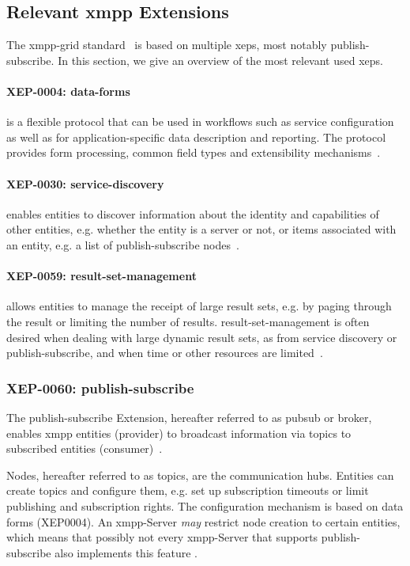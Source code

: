 \subsection{Relevant \gls{xmpp} Extensions}

The \gls{xmpp-grid} standard~\cite{ietf-mile-xmpp-grid-05} is based on multiple \glspl{xep}, most notably \gls{publish-subscribe}. In this section, we give an overview of the most relevant used \glspl{xep}.

\paragraph{XEP-0004: \gls{data-forms}} is a flexible protocol that can be used in workflows such as service configuration as well as for application-specific data description and reporting. The protocol provides form processing, common field types and extensibility mechanisms~\cite{xep-0004}.

\paragraph{XEP-0030: \gls{service-discovery}} enables entities to discover information about the identity and capabilities of other entities, e.g. whether the entity is a server or not, or items associated with an entity, e.g. a list of \gls{publish-subscribe} nodes~\cite{xep-0030}.

\paragraph{XEP-0059: \gls{result-set-management}} allows entities to manage the receipt of large result sets, e.g. by paging through the result or limiting the number of results. \gls{result-set-management} is often desired when dealing with large dynamic result sets, as from service discovery or publish-subscribe, and when time or other resources are limited~\cite{xep-0059}.

\subsubsection{XEP-0060: \gls{publish-subscribe}}
The \gls{publish-subscribe} Extension, hereafter referred to as \gls{pubsub} or \gls{broker}, enables \gls{xmpp} entities (\gls{provider}) to broadcast information via \glspl{topic} to subscribed entities (\gls{consumer})~\cite{xep-0060}.

Nodes, hereafter referred to as \glspl{topic}, are the communication hubs. Entities can create \glspl{topic} and configure them, e.g. set up subscription timeouts or limit publishing and subscription rights. The configuration mechanism is based on data forms (XEP0004). An \gls{xmpp}-Server \emph{may} restrict node creation to certain entities, which means that possibly not every \gls{xmpp}-Server that supports \gls{publish-subscribe} also implements this feature \cite{rfc2119}.

